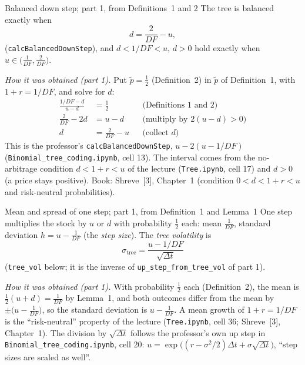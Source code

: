 \documentclass[11pt,a4paper]{article}
\begin{document}
\begin{lembox}{Balanced down step; part 1, from Definitions~1 and 2}
The tree is balanced exactly when
\begin{equation}\label{eq:down}
d=\frac{2}{DF}-u ,
\end{equation}
(\texttt{calcBalancedDownStep}), and $d<1/DF<u$, $d>0$ hold exactly when $u\in\bigl(\frac1{DF},\frac2{DF}\bigr)$.
\end{lembox}
\noindent\emph{How it was obtained (part 1).} Put $\tilde p=\frac12$ (Definition~2) in $\tilde p$ of Definition~1, with $1+r=1/DF$, and solve for $d$:
\begin{align*}
\frac{1/DF-d}{u-d} &= \frac12 && \text{(Definitions 1 and 2)}\\
\frac{2}{DF}-2d &= u-d && \text{(multiply by $2(u-d)>0$)}\\
d &= \frac{2}{DF}-u && \text{(collect $d$)}
\end{align*}
This is the professor's \texttt{calcBalancedDownStep}, $u-2(u-1/DF)$ (\texttt{Binomial\_tree\_coding.ipynb}, cell 13). The interval comes from the no-arbitrage condition $d<1+r<u$ of the lecture (\texttt{Tree.ipynb}, cell 17) and $d>0$ (a price stays positive). Book: Shreve~[3], Chapter~1 (condition $0<d<1+r<u$ and risk-neutral probabilities).


\begin{lembox}{Mean and spread of one step; part 1, from Definition~1 and Lemma~1}
One step multiplies the stock by $u$ or $d$ with probability $\frac12$ each: mean $\frac1{DF}$, standard deviation $h=u-\frac1{DF}$ (the \emph{step size}). The \emph{tree volatility} is
\begin{equation}\label{eq:vol}
\sigma_{\text{tree}}=\frac{u-1/DF}{\sqrt{\Delta t}}
\end{equation}
(\texttt{tree\_vol} below; it is the inverse of \texttt{up\_step\_from\_tree\_vol} of part 1).
\end{lembox}
\noindent\emph{How it was obtained (part 1).} With probability $\frac12$ each (Definition~2), the mean is $\frac12(u+d)=\frac1{DF}$ by Lemma~1, and both outcomes differ from the mean by $\pm\bigl(u-\frac1{DF}\bigr)$, so the standard deviation is $u-\frac1{DF}$. A mean growth of $1+r=1/DF$ is the ``risk-neutral'' property of the lecture (\texttt{Tree.ipynb}, cell 36; Shreve~[3], Chapter~1). The division by $\sqrt{\Delta t}$ follows the professor's own up step in \texttt{Binomial\_tree\_coding.ipynb}, cell 20: $u=\exp\bigl((r-\sigma^2/2)\Delta t+\sigma\sqrt{\Delta t}\bigr)$, ``step sizes are scaled as well''.
\end{document}
